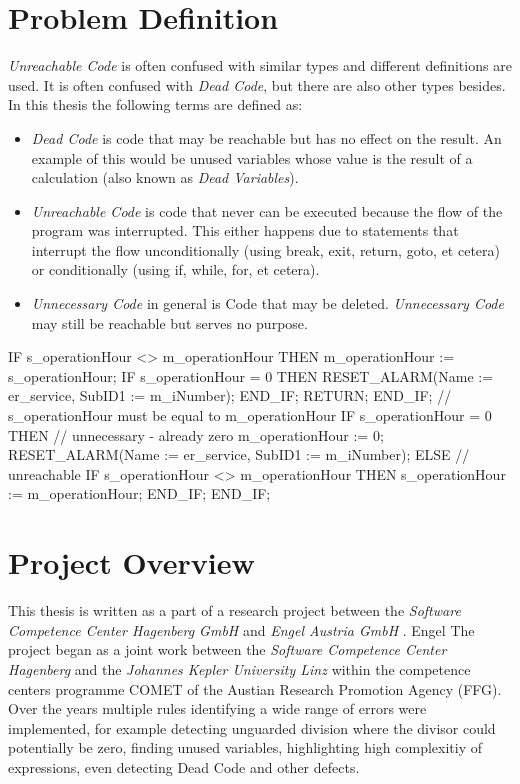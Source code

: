 \section{Problem Definition}
\emph{Unreachable Code} is often confused with similar types and different definitions are used. It is often confused with \emph{Dead Code}, but there are also other types besides.
In this thesis the following terms are defined as:
\begin{itemize}
  \item \emph{Dead Code} is code that may be reachable but has no effect on the result. An example of this would be unused variables whose value is the result of a calculation (also known as \emph{Dead Variables}).
  \item \emph{Unreachable Code} is code that never can be executed because the flow of the program was interrupted. This either happens due to statements that interrupt the flow unconditionally (using break, exit, return, goto, et cetera) or conditionally (using if, while, for, et cetera).
  \item \emph{Unnecessary Code} in general is Code that may be deleted. \emph{Unnecessary Code} may still be reachable but serves no purpose.
\end{itemize}

\begin{GenericCode}
IF s_operationHour <> m_operationHour THEN
    m_operationHour := s_operationHour;
    IF s_operationHour = 0 THEN
        RESET_ALARM(Name := er_service, SubID1 := m_iNumber);
    END_IF;
    RETURN;
END_IF;
// s_operationHour must be equal to m_operationHour
IF s_operationHour = 0 THEN
// unnecessary - already zero
    m_operationHour := 0;
    RESET_ALARM(Name := er_service, SubID1 := m_iNumber);
ELSE
    // unreachable
    IF s_operationHour <> m_operationHour THEN
        s_operationHour := m_operationHour;
    END_IF;
END_IF;
\end{GenericCode}

\section{Project Overview}
This thesis is written as a part of a research project between the \emph{Software Competence Center Hagenberg GmbH} \cite{ScchGmbH} and \emph{Engel Austria GmbH} \cite{EngelGmbH}.
Engel
The project began as a joint work between the \emph{Software Competence Center Hagenberg} and the \emph{Johannes Kepler University Linz} \cite{Prahofer_2012} within the competence centers programme COMET of the Austian Research Promotion Agency (FFG).
Over the years multiple rules identifying a wide range of errors were implemented, for example detecting unguarded division where the divisor could potentially be zero, finding unused variables, highlighting high complexitiy of expressions, even detecting Dead Code and other defects.

